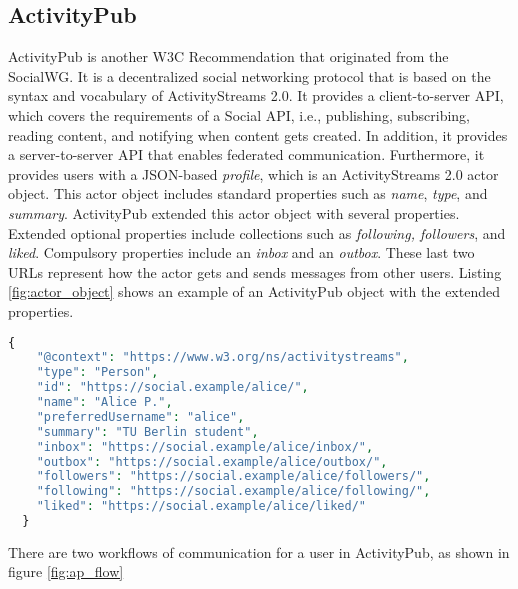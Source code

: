 \subsection{ActivityPub}\label{subsec:activitypub}

ActivityPub is another W3C Recommendation that originated from the SocialWG. It is a decentralized social networking protocol that is based on the syntax and vocabulary of ActivityStreams 2.0. It provides a client-to-server API, which covers the requirements of a Social API\cite{guy_2017}, i.e., publishing, subscribing, reading content, and notifying when content gets created. In addition, it provides a server-to-server API that enables federated communication. Furthermore, it provides users with a JSON-based \emph{profile}, which is an ActivityStreams 2.0 actor object. This actor object includes standard properties such as \emph{name}, \emph{type}, and \emph{summary}. ActivityPub extended this actor object with several properties. Extended optional properties include collections such as \emph{following, followers}, and \emph{liked}. Compulsory properties include an \emph{inbox} and an \emph{outbox}. These last two URLs represent how the actor gets and sends messages from other users. Listing \ref{fig:actor_object} shows an example of an ActivityPub object with the extended properties. 


\lstset{style=JSONStyle}
\begin{lstlisting}[language=PHP, caption=Actor object example in ActivityPub \cite{lemmer-webber_tallon_guy_prodromou_2018}, label=fig:actor_object, float=h!]
  {
    "@context": "https://www.w3.org/ns/activitystreams",
    "type": "Person",
    "id": "https://social.example/alice/",
    "name": "Alice P.",
    "preferredUsername": "alice",
    "summary": "TU Berlin student",
    "inbox": "https://social.example/alice/inbox/",
    "outbox": "https://social.example/alice/outbox/",
    "followers": "https://social.example/alice/followers/",
    "following": "https://social.example/alice/following/",
    "liked": "https://social.example/alice/liked/"
  }
\end{lstlisting}

There are two workflows of communication for a user in ActivityPub, as shown in figure \ref{fig:ap_flow} \label{subsec:ap_workflows}

